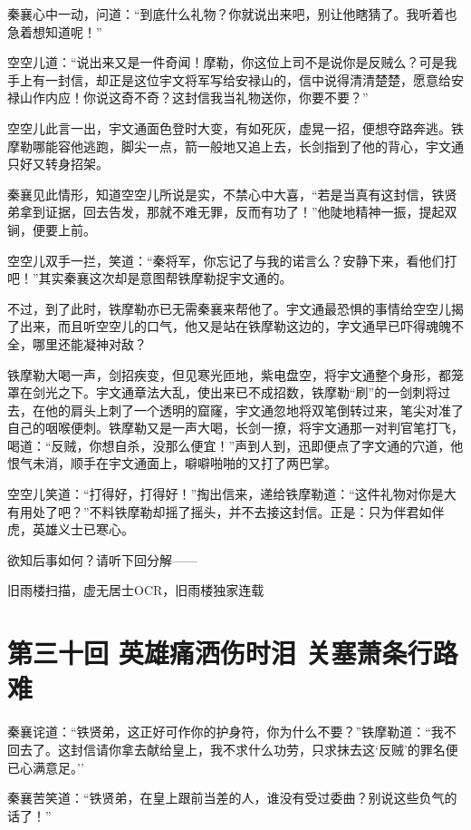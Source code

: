 \documentclass[12pt,oneside]{book}
\begin{document}
秦襄心中一动，问道：``到底什么礼物？你就说出来吧，别让他瞎猜了。我听着也急着想知道呢！''

空空儿道：``说出来又是一件奇闻！摩勒，你这位上司不是说你是反贼么？可是我手上有一封信，却正是这位宇文将军写给安禄山的，信中说得清清楚楚，愿意给安禄山作内应！你说这奇不奇？这封信我当礼物送你，你要不要？''

空空儿此言一出，宇文通面色登时大变，有如死灰，虚晃一招，便想夺路奔逃。铁摩勒哪能容他逃跑，脚尖一点，箭一般地又追上去，长剑指到了他的背心，宇文通只好又转身招架。

秦襄见此情形，知道空空儿所说是实，不禁心中大喜，``若是当真有这封信，铁贤弟拿到证据，回去告发，那就不难无罪，反而有功了！''他陡地精神一振，提起双锏，便要上前。

空空儿双手一拦，笑道：``秦将军，你忘记了与我的诺言么？安静下来，看他们打吧！''其实秦襄这次却是意图帮铁摩勒捉宇文通的。

不过，到了此时，铁摩勒亦已无需秦襄来帮他了。宇文通最恐惧的事情给空空儿揭了出来，而且听空空儿的口气，他又是站在铁摩勒这边的，字文通早已吓得魂魄不全，哪里还能凝神对敌？

铁摩勒大喝一声，剑招疾变，但见寒光匝地，紫电盘空，将宇文通整个身形，都笼罩在剑光之下。宇文通章法大乱，使出来已不成招数，铁摩勒``刷''的一剑刺将过去，在他的肩头上刺了一个透明的窟窿，宇文通忽地将双笔倒转过来，笔尖对准了自己的咽喉便刺。铁摩勒又是一声大喝，长剑一撩，将宇文通那一对判官笔打飞，喝道：``反贼，你想自杀，没那么便宜！''声到人到，迅即便点了字文通的穴道，他恨气未消，顺手在宇文通面上，噼噼啪啪的又打了两巴掌。

空空儿笑道：``打得好，打得好！''掏出信来，递给铁摩勒道：``这件礼物对你是大有用处了吧？''不料铁摩勒却摇了摇头，并不去接这封信。正是：只为伴君如伴虎，英雄义士已寒心。

欲知后事如何？请听下回分解------

旧雨楼扫描，虚无居士OCR，旧雨楼独家连载

\chapter{第三十回 英雄痛洒伤时泪
关塞萧条行路难}\label{ux7b2cux4e09ux5341ux56de-ux82f1ux96c4ux75dbux6d12ux4f24ux65f6ux6cea-ux5173ux585eux8427ux6761ux884cux8defux96be}

秦襄诧道：``铁贤弟，这正好可作你的护身符，你为什么不要？''铁摩勒道：``我不回去了。这封信请你拿去献给皇上，我不求什么功劳，只求抹去这`反贼'的罪名便已心满意足。''

秦襄苦笑道：``铁贤弟，在皇上跟前当差的人，谁没有受过委曲？别说这些负气的话了！''
\end{document}
